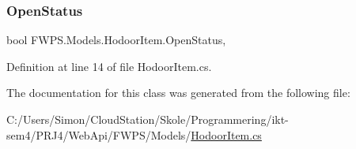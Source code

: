 \subsubsection{\texorpdfstring{Open\+Status}{OpenStatus}}
{\footnotesize\ttfamily bool F\+W\+P\+S.\+Models.\+Hodoor\+Item.\+Open\+Status\hspace{0.3cm}{\ttfamily [get]}, {\ttfamily [set]}}



Definition at line 14 of file Hodoor\+Item.\+cs.



The documentation for this class was generated from the following file\+:\begin{DoxyCompactItemize}
\item 
C\+:/\+Users/\+Simon/\+Cloud\+Station/\+Skole/\+Programmering/ikt-\/sem4/\+P\+R\+J4/\+Web\+Api/\+F\+W\+P\+S/\+Models/\mbox{\hyperlink{_web_api_2_f_w_p_s_2_models_2_hodoor_item_8cs}{Hodoor\+Item.\+cs}}\end{DoxyCompactItemize}
